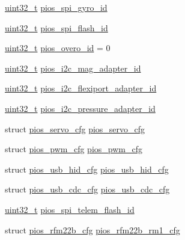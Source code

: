\begin{DoxyCompactItemize}
\item 
\hyperlink{stdint_8h_a435d1572bf3f880d55459d9805097f62}{uint32\-\_\-t} \hyperlink{group___tau_labs_core_gaa3af759a1b634a729e4688dc40026875}{pios\-\_\-spi\-\_\-gyro\-\_\-id}
\item 
\hyperlink{stdint_8h_a435d1572bf3f880d55459d9805097f62}{uint32\-\_\-t} \hyperlink{group___tau_labs_core_gaebc54f2c5fc298fad979df4d9bd1414b}{pios\-\_\-spi\-\_\-flash\-\_\-id}
\item 
\hyperlink{stdint_8h_a435d1572bf3f880d55459d9805097f62}{uint32\-\_\-t} \hyperlink{group___tau_labs_core_ga6068626ce5d15d09ba077204ea2fd43d}{pios\-\_\-overo\-\_\-id} = 0
\item 
\hyperlink{stdint_8h_a435d1572bf3f880d55459d9805097f62}{uint32\-\_\-t} \hyperlink{group___tau_labs_core_gaf4677b648f4c1c967ab57a2994d6f1a6}{pios\-\_\-i2c\-\_\-mag\-\_\-adapter\-\_\-id}
\item 
\hyperlink{stdint_8h_a435d1572bf3f880d55459d9805097f62}{uint32\-\_\-t} \hyperlink{group___tau_labs_core_ga20b68de0b754d943d653d816aad86148}{pios\-\_\-i2c\-\_\-flexiport\-\_\-adapter\-\_\-id}
\item 
\hyperlink{stdint_8h_a435d1572bf3f880d55459d9805097f62}{uint32\-\_\-t} \hyperlink{group___tau_labs_core_gaeae0f7b45b9d077ba85b774812c03550}{pios\-\_\-i2c\-\_\-pressure\-\_\-adapter\-\_\-id}
\item 
struct \hyperlink{structpios__servo__cfg}{pios\-\_\-servo\-\_\-cfg} \hyperlink{group___tau_labs_core_ga57a87ef16d7949a9cc3589efc8d88a28}{pios\-\_\-servo\-\_\-cfg}
\item 
struct \hyperlink{structpios__pwm__cfg}{pios\-\_\-pwm\-\_\-cfg} \hyperlink{group___tau_labs_core_ga7587f8e174df90bef8cec1edfa9e14c1}{pios\-\_\-pwm\-\_\-cfg}
\item 
struct \hyperlink{structpios__usb__hid__cfg}{pios\-\_\-usb\-\_\-hid\-\_\-cfg} \hyperlink{group___tau_labs_core_ga3665f6d3a2cccc431b55b9432291e94c}{pios\-\_\-usb\-\_\-hid\-\_\-cfg}
\item 
struct \hyperlink{structpios__usb__cdc__cfg}{pios\-\_\-usb\-\_\-cdc\-\_\-cfg} \hyperlink{group___tau_labs_core_ga05cc3e449d417c7f9097d2659e6f5ca3}{pios\-\_\-usb\-\_\-cdc\-\_\-cfg}
\item 
\hyperlink{stdint_8h_a435d1572bf3f880d55459d9805097f62}{uint32\-\_\-t} \hyperlink{group___tau_labs_core_gabcea731eedc7b51eae0e4074e35fc8c1}{pios\-\_\-spi\-\_\-telem\-\_\-flash\-\_\-id}
\item 
struct \hyperlink{structpios__rfm22b__cfg}{pios\-\_\-rfm22b\-\_\-cfg} \hyperlink{group___tau_labs_core_ga74080000cc730f990607c938f6984f3e}{pios\-\_\-rfm22b\-\_\-rm1\-\_\-cfg}

\end{DoxyCompactItemize}
